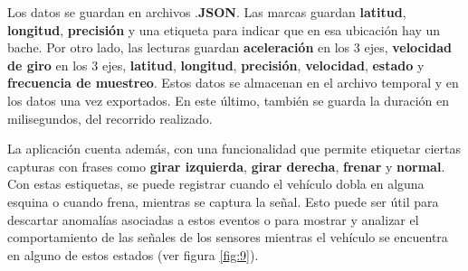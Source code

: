 	Los datos se guardan en archivos .\textbf{JSON}. Las marcas guardan \textbf{latitud}, \textbf{longitud}, \textbf{precisión} y una 
	etiqueta para indicar que en esa ubicación hay un bache. Por otro lado, las lecturas guardan \textbf{aceleración} en los 3 ejes, 
	\textbf{velocidad de giro} en los 3 ejes, \textbf{latitud}, \textbf{longitud}, \textbf{precisión}, \textbf{velocidad}, \textbf{estado}
	y \textbf{frecuencia de muestreo}. Estos datos se almacenan en el archivo temporal y en los datos una vez exportados. En este último, también 
	se guarda la duración en milisegundos, del recorrido realizado.

	La aplicación cuenta además, con una funcionalidad que permite etiquetar ciertas capturas con frases como \textbf{girar izquierda},
	\textbf{girar derecha}, \textbf{frenar} y \textbf{normal}. Con estas estiquetas, se puede registrar cuando el vehículo dobla en alguna
	esquina o cuando frena, mientras se captura la señal. Esto puede ser útil para descartar anomalías asociadas a estos eventos o
	para mostrar y analizar el comportamiento de las señales de los sensores mientras el vehículo se encuentra en alguno de estos estados
	(ver figura \ref{fig:9}).

